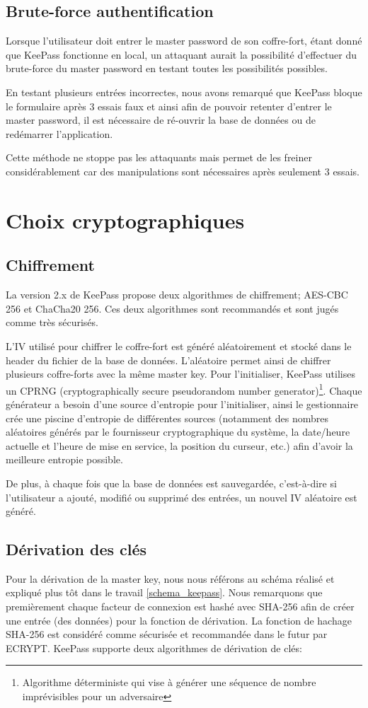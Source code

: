 \subsection{Brute-force authentification}

Lorsque l'utilisateur doit entrer le master password de son coffre-fort, étant donné que KeePass fonctionne en local, un attaquant aurait la possibilité d'effectuer du brute-force du master password en testant toutes les possibilités possibles. 

En testant plusieurs entrées incorrectes, nous avons remarqué que KeePass bloque le formulaire après 3 essais faux et ainsi afin de pouvoir retenter d'entrer le master password, il est nécessaire de ré-ouvrir la base de données ou de redémarrer l'application. 

Cette méthode ne stoppe pas les attaquants mais permet de les freiner considérablement car des manipulations sont nécessaires après seulement 3 essais. 
\section{Choix cryptographiques}
\subsection{Chiffrement}
La version 2.x de KeePass propose deux algorithmes de chiffrement; AES-CBC 256 et ChaCha20 256. Ces deux algorithmes sont recommandés et sont jugés comme très sécurisés\cite{ecrypt}. 

L'IV utilisé pour chiffrer le coffre-fort est généré aléatoirement et stocké dans le header du fichier de la base de données. L'aléatoire permet ainsi de chiffrer plusieurs coffre-forts avec la même master key. Pour l'initialiser, KeePass utilises un CPRNG (cryptographically secure pseudorandom number generator)\footnote{Algorithme déterministe qui vise à générer une séquence de nombre imprévisibles pour un adversaire}. Chaque générateur a besoin d'une source d'entropie pour l'initialiser, ainsi le gestionnaire crée une piscine d'entropie de différentes sources (notamment des nombres aléatoires générés par le fournisseur cryptographique du système, la date/heure actuelle et l'heure de mise en service, la position du curseur, etc.) afin d'avoir la meilleure entropie possible.

De plus, à chaque fois que la base de données est sauvegardée, c'est-à-dire si l'utilisateur a ajouté, modifié ou supprimé des entrées, un nouvel IV aléatoire est généré. 
\subsection{Dérivation des clés}
Pour la dérivation de la master key, nous nous référons au schéma réalisé et expliqué plus tôt dans le travail \ref{schema_keepass}. Nous remarquons que premièrement chaque facteur de connexion est hashé avec SHA-256 afin de créer une entrée (des données) pour la fonction de dérivation. La fonction de hachage SHA-256 est considéré comme sécurisée et recommandée dans le futur par ECRYPT. KeePass supporte deux algorithmes de dérivation de clés:

